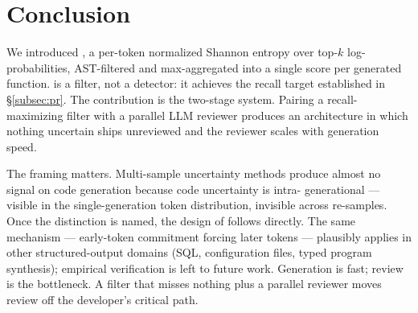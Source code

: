 \section{Conclusion}
\label{sec:conclusion}

We introduced \eps, a per-token normalized Shannon entropy over top-$k$
log-probabilities, AST-filtered and max-aggregated into a single score
per generated function. \eps is a filter, not a detector: it achieves the recall target
established in \S\ref{subsec:pr}. The contribution is the two-stage system.
Pairing a recall-maximizing filter with a parallel LLM reviewer
produces an architecture in which nothing uncertain ships unreviewed
and the reviewer scales with generation speed.

The framing matters. Multi-sample uncertainty methods produce almost
no signal on code generation because code uncertainty is intra-%
generational --- visible in the single-generation token distribution,
invisible across re-samples. Once the distinction is named, the
design of \eps follows directly. The same mechanism --- early-token
commitment forcing later tokens --- plausibly applies in other
structured-output domains (SQL, configuration files, typed program
synthesis); empirical verification is left to future work. Generation
is fast; review is the bottleneck. A filter that misses nothing plus
a parallel reviewer moves review off the developer's critical path.
